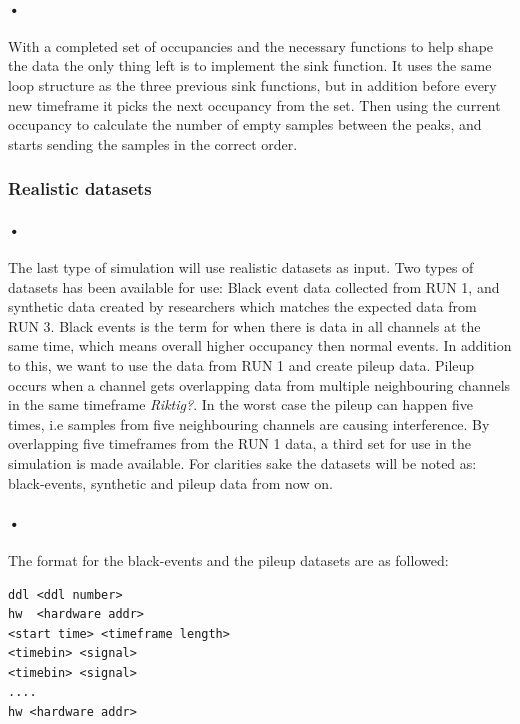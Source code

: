 \documentclass[a4paper, 12pt]{report}
\begin{document}
\paragraph{•}
With a completed set of occupancies and the necessary functions to help shape the data the only thing left is to implement the sink function.
It uses the same loop structure as the three previous sink functions, but in addition before every new timeframe it picks the next occupancy from the set.
Then using the current occupancy to calculate the number of empty samples between the peaks, and starts sending the samples in the correct order.

\subsubsection{Realistic datasets}
\label{subsubsec:real-data}

\paragraph{•}
The last type of simulation will use realistic datasets as input. 
Two types of datasets has been available for use: Black event data collected from RUN 1, and synthetic data created by researchers which matches the expected data from RUN 3.
Black events is the term for when there is data in all channels at the same time, which means overall higher occupancy then normal events.
In addition to this, we want to use the data from RUN 1 and create pileup data.
Pileup occurs when a channel gets overlapping data from multiple neighbouring channels in the same timeframe \textit{Riktig?}.
In the worst case the pileup can happen five times, i.e samples from five neighbouring channels are causing interference.
By overlapping five timeframes from the RUN 1 data, a third set for use in the simulation is made available.
For clarities sake the datasets will be noted as: black-events, synthetic and pileup data from now on.
 
\paragraph{•} 
The format for the black-events and the pileup datasets are as followed:
\begin{minipage}{\linewidth}
\begin{lstlisting}[caption=Format for the black-event and pileup dataset., label=lst:black-event-format]
ddl <ddl number>
hw  <hardware addr>
<start time> <timeframe length>
<timebin> <signal>
<timebin> <signal>
....
hw <hardware addr>
\end{lstlisting}
\end{minipage}
\end{document}
